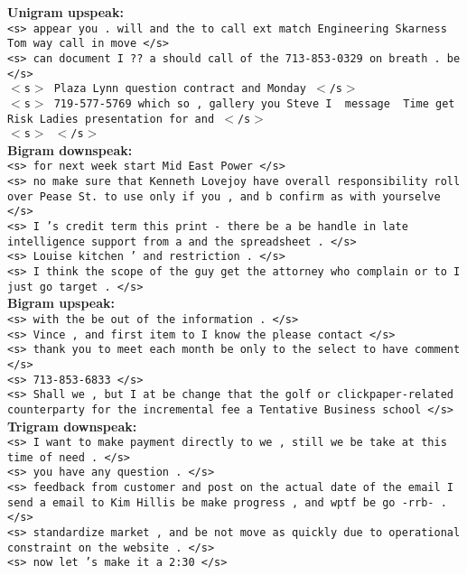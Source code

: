 \documentclass{article} %
\begin{document}
\textbf{Unigram upspeak:}\\

\texttt{<s> appear you . will and the to call ext match Engineering Skarness Tom way call in move </s>\\
<s> can document I ?? a should call of the 713-853-0329 on breath . be </s>\\
$<$s$>$ Plaza Lynn question contract and Monday $<$/s$>$\\
$<$s$>$ 719-577-5769 which so , gallery you Steve I \ message \ Time get Risk Ladies presentation for and $<$/s$>$\\
$<$s$>$ $<$/s$>$}\\

\textbf{Bigram downspeak:}\\

\texttt{<s> for next week start Mid East Power </s>\\
<s> no make sure that Kenneth Lovejoy have overall responsibility roll over Pease St. to use only if you , and b confirm as with yourselve </s>\\
<s> I 's credit term this print - there be a be handle in late intelligence support from a and the spreadsheet . </s>\\
<s> Louise kitchen ' and restriction . </s>\\
<s> I think the scope of the guy get the attorney who complain or to I just go target . </s>}\\

\textbf{Bigram upspeak: }\\

\texttt{<s> with the be out of the information . </s>\\
<s> Vince , and first item to I know the please contact </s>\\
<s> thank you to meet each month be only to the select to have comment </s>\\
<s> 713-853-6833 </s>\\
<s> Shall we , but I at be change that the golf or clickpaper-related counterparty for the incremental fee a Tentative Business school </s>}\\

\textbf{Trigram downspeak:}\\

\texttt{<s> I want to make payment directly to we , still we be take at this time of need . </s>\\
<s> you have any question . </s>\\
<s> feedback from customer and post on the actual date of the email I send a email to Kim Hillis be make progress , and wptf be go -rrb- . </s>\\
<s> standardize market , and be not move as quickly due to operational constraint on the website . </s>\\
<s> now let 's make it a 2:30 </s>}\\
\end{document}
